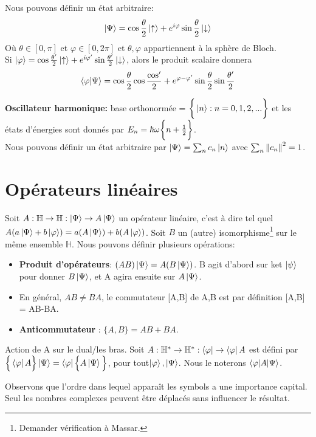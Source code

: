 \documentclass[../notesdecours.tex]{subfiles}
\begin{document}
Nous pouvons définir un état arbitraire:
\begin{equation}
\ket{\Psi} = \cos\frac{\theta}{2} \ket{\uparrow}+e^{i\varphi}\sin\frac{\theta}{2}\ket{\downarrow}
\end{equation}
Où $\theta\in[0,\pi]$ et $\varphi \in [0,2\pi]$ et $\theta,\varphi$ appartiennent à la sphère de Bloch.\\

Si $\ket{\varphi} = \cos\frac{\theta'}{2}\ket{\uparrow}+e^{i\varphi'}\sin\frac{\theta'}{2}\ket{\downarrow}$, alors le produit scalaire donnera
\begin{equation}
\braket{\varphi|\Psi} = \cos\frac{\theta}{2}\cos\frac{\cos'}{2}+e^{\varphi-\varphi'}\sin\frac{\theta}{2}\sin\frac{\theta'}{2}
\end{equation}

\textbf{Oscillateur harmonique:} base orthonormée = $\bigg\{\ket{n} : n=0,1,2,...\bigg\}$ et les états d'énergies sont donnés par $E_n = \hbar\omega\bigg\{n+\frac{1}{2}\bigg\}$.\\

Nous pouvons définir un état arbitraire par $\ket{\Psi} = \sum_n c_n \ket{n}$ avec $\sum_n \norm{c_n}^2 = 1$.

\section{Opérateurs linéaires}
Soit $A : \mathbb{H} \rightarrow \mathbb{H} : \ket{\Psi} \rightarrow A\ket{\Psi}$ un opérateur linéaire, c'est à dire tel quel $A(a\ket{\Psi}+b\ket{\varphi}) = a(A\ket{\Psi})+b(A\ket{\varphi})$. Soit $B$ un (autre) isomorphisme\footnote{Demander vérification à Massar.} sur le même ensemble $\mathbb{H}$. Nous pouvons définir plusieurs opérations:
\begin{itemize}
\item \textbf{Produit d'opérateurs}: $(AB)\ket{\Psi} = A(B\ket{\Psi})$. B agit d'abord sur ket $\ket{\psi}$ pour donner $B\ket{\Psi}$, et A agira ensuite sur $A\ket{\Psi}$.
\item En général, $AB\neq BA$, le commutateur [A,B] de A,B est par définition [A,B] = AB-BA.
\item \textbf{Anticommutateur} : $\bigg\{A,B\bigg\} = AB+BA$.
\end{itemize}
Action de A sur le dual/les bras. Soit $A: \mathbb{H}^* \rightarrow \mathbb{H}^* : \bra{\varphi} \rightarrow \bra{\varphi}A$ est défini par $\Big\{\bra{\varphi}A\Big\}\ket{\Psi} = \bra{\varphi}\Big\{A\ket{\Psi}\Big\}$, pour tout$\ket{\varphi},\ket{\Psi}$. Nous le noterons $\braket{\varphi|A|\Psi}$.
\begin{remark} Observons que l'ordre dans lequel apparaît les symbols a une importance capital. Seul les nombres complexes peuvent être déplacés sans influencer le résultat. \end{remark}
\end{document}
